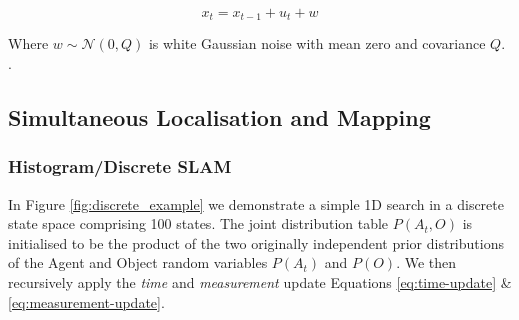 \begin{equation} \label{eq:dynamical_model}
  x_{t} = x_{t-1} + u_{t} + w \nonumber
\end{equation}

Where $w \sim \mathcal{N}(0,Q)$ is white Gaussian noise with mean zero and covariance $Q$. .

\subsection{Simultaneous Localisation and Mapping}

\subsubsection{Histogram/Discrete SLAM}\label{sec:Discrete}

In Figure \ref{fig:discrete_example} we demonstrate a simple 1D search in a discrete state space comprising 100 states. The joint
distribution table $P(A_t,O)$ is initialised to be the product of the two originally independent prior distributions of
the Agent and Object random variables $P(A_t)$ and $P(O)$. We then recursively apply the \textit{time} 
and \textit{measurement} update Equations \ref{eq:time-update} \& \ref{eq:measurement-update}.

